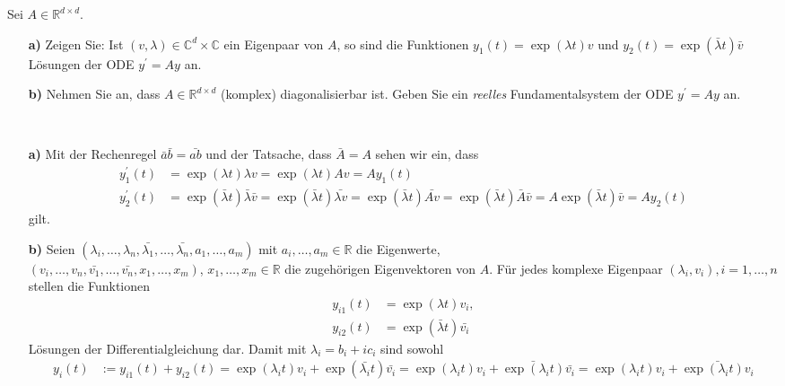 \begin{exercise}
Sei $A \in \mathbb{R}^{d\times d}$.
\begin{itemize}
  \item [\textbf{a)}]Zeigen Sie: Ist $(v,\lambda) \in \mathbb{C}^d
  \times \mathbb{C}$ ein Eigenpaar von $A$, so sind die Funktionen
  $y_1(t) = \exp(\lambda t)v$ und $y_2(t) = \exp(\bar{\lambda}t)\bar{v}$
  Lösungen der ODE $y^{\prime} = Ay$ an.
  \item [\textbf{b)}] Nehmen Sie an, dass $A \in \mathbb{R}^
  {d \times d}$ (komplex) diagonalisierbar ist. Geben Sie ein
  \textit{reelles} Fundamentalsystem der ODE $y^{\prime} = Ay$ an.
\end{itemize}
\end{exercise}
\begin{solution}
\leavevmode \\
\begin{itemize}
  \item [\textbf{a)}]
  Mit der Rechenregel $\bar{a}\bar{b} = \bar{ab}$ und der Tatsache, dass $\bar{A} = A$
  sehen wir ein, dass
  \begin{align*}
    y_1^{\prime}(t) &= \exp(\lambda t)\lambda v = \exp(\lambda t)A v = Ay_1(t) \\
    y_2^{\prime}(t) &= \exp(\bar{\lambda}t)\bar{\lambda}\bar{v} = \exp(\bar{\lambda}t) \bar{\lambda v} =
    \exp(\bar{\lambda}t) \bar{Av} =  \exp(\bar{\lambda}t) \bar{A}\bar{v} = A\exp(\bar{\lambda}t)\bar{v} = Ay_2(t)
  \end{align*}
  gilt.
  \item [\textbf{b)}]
  Seien $(\lambda_i,\dots,\lambda_n,\bar{\lambda_1},\dots,\bar{\lambda_n},a_1,\dots,a_m)$
  mit $a_i,\dots,a_m \in \mathbb{R}$ die Eigenwerte, \\
  $(v_i,\dots,v_n,\bar{v_1},\dots,\bar{v_n},x_1,\dots,x_m)$, $x_1,\dots,x_m \in \mathbb{R}$
  die zugehörigen Eigenvektoren von $A$.
  Für jedes komplexe Eigenpaar $(\lambda_i, v_i), i = 1,\dots,n$ stellen die Funktionen
  \begin{align*}
    y_{i1}(t) &= \exp(\lambda t)v_i, \\
    y_{i2}(t) &= \exp(\bar{\lambda} t)\bar{v_i}
  \end{align*}
  Lösungen der Differentialgleichung dar. Damit mit $\lambda_i = b_i + ic_i$ sind sowohl
  \begin{align*}
    y_i(t) &:= y_{i1}(t) + y_{i2}(t) = \exp(\lambda_i t)v_i + \exp(\bar{\lambda_i} t)\bar{v_i}
    = \exp(\lambda_i t)v_i + \bar{\exp(\lambda_i t)}\bar{v_i}
    = \exp(\lambda_i t)v_i + \bar{\exp(\lambda_i t)v_i}

\end{align*}
\end{itemize}
\end{solution}
